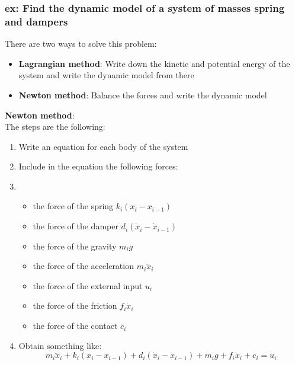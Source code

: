 \documentclass[a4paper,12pt]{article}
\begin{document}
\subsubsection{ex: Find the dynamic model of a system of masses
spring and dampers} \label{sec:ex: find the dynaic model of a system of masses}
There are two ways to solve this problem:
\begin{itemize}
    \item \textbf{Lagrangian method}: Write down the kinetic
     and potential energy of the system and 
     write the dynamic model from there
    \item \textbf{Newton method}: Balance the forces and 
    write the dynamic model
\end{itemize}
\textbf{Newton method}:\\
The steps are the following:
\begin{enumerate}
    \item Write an equation for each body of the system
    \item Include in the equation the following forces:
    \item \begin{itemize}
        \item the force of the spring $k_i(x_i-x_{i-1})$
        \item the force of the damper $d_i(\dot{x}_i-\dot{x}_{i-1})$
        \item the force of the gravity $m_i g$
        \item the force of the acceleration $m_i \ddot{x}_i$
        \item the force of the external input $u_i$
        \item the force of the friction $f_i \dot{x}_i$
        \item the force of the contact $c_i$
    \end{itemize}
    \item Obtain something like: \begin{equation}
        m_i \ddot{x}_i + k_i(x_i-x_{i-1}) + d_i(\dot{x}_i-\dot{x}_{i-1}) + m_i g + f_i \dot{x}_i + c_i = u_i
    \end{equation}
\end{enumerate}
\end{document}
